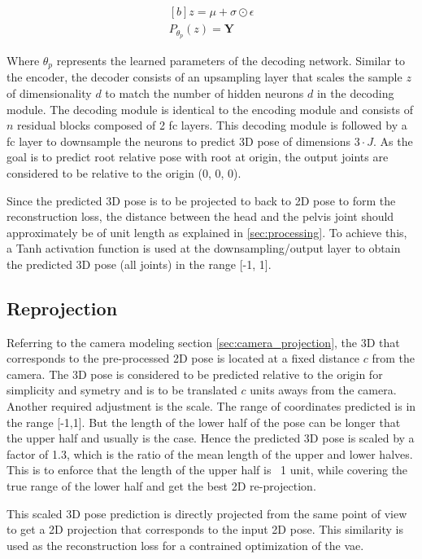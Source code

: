 \begin{equation} \label{eqn:P_fn}
    \begin{gathered}[b]
        z = \mu + \sigma \odot \epsilon \\
        P_{\theta_p}(z) = \textbf{Y}
    \end{gathered}
\end{equation}

Where $\theta_p$ represents the learned parameters of the decoding network. Similar to the encoder, the decoder consists of an upsampling layer that scales the sample $z$ of dimensionality $d$ to match the number of hidden neurons $d$ in the decoding module. The decoding module is identical to the encoding module and consists of $n$ residual blocks composed of 2 \ac{fc} layers. This decoding module is followed by a \ac{fc} layer to downsample the neurons to predict 3D pose of dimensions $3\!\cdot\!J$. As the goal is to predict root relative pose with root at origin, the output joints are considered to be relative to the origin (0, 0, 0).

Since the predicted 3D pose is to be projected to back to 2D pose to form the reconstruction loss, the distance between the head and the pelvis joint should approximately be of unit length as explained in \ref{sec:processing}. To achieve this, a Tanh activation function is used at the downsampling/output layer to obtain the predicted 3D pose (all joints) in the range [-1, 1]. %

\subsection{Reprojection}
\label{subsec:reproject}
Referring to the camera modeling section \ref{sec:camera_projection}, the 3D that corresponds to the pre-processed 2D pose is located at a fixed distance $c$ from the camera. The 3D pose is considered to be predicted relative to the origin for simplicity and symetry and is to be translated $c$ units aways from the camera. Another required adjustment is the scale. The range of coordinates predicted is in the range [-1,1]. But the length of the lower half of the pose can be longer that the upper half and usually is the case. Hence the predicted 3D pose is scaled by a factor of 1.3, which is the ratio of the mean length of the upper and lower halves. This is to enforce that the length of the upper half is ~1 unit, while covering the true range of the lower half and get the best 2D re-projection.

This scaled 3D pose prediction is directly projected from the same point of view to get a 2D projection that corresponds to the input 2D pose. This similarity is used as the reconstruction loss for a contrained optimization of the \ac{vae}.

